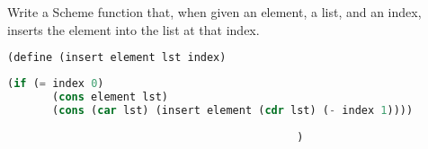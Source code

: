 \question Write a Scheme function that, when given an element, a list, and an
index, inserts the element into the list at that index.
\begin{lstlisting}[language=Scheme]
(define (insert element lst index)
\end{lstlisting}
\begin{solution}[0.5in]
\begin{lstlisting}[language=Scheme]
   (if (= index 0)
       (cons element lst)
       (cons (car lst) (insert element (cdr lst) (- index 1))))
\end{lstlisting}
\end{solution}
\begin{lstlisting}
                                             )
\end{lstlisting}

